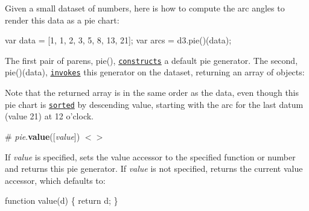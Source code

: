 Given a small dataset of numbers, here is how to compute the arc angles to render this data as a pie chart\+:


\begin{DoxyCode}
var data = [1, 1, 2, 3, 5, 8, 13, 21];
var arcs = d3.pie()(data);
\end{DoxyCode}


The first pair of parens, {\ttfamily pie()}, \href{#pie}{\tt constructs} a default pie generator. The second, {\ttfamily pie()(data)}, \href{#_pie}{\tt invokes} this generator on the dataset, returning an array of objects\+:


\begin{DoxyCode}
\end{DoxyCode}


Note that the returned array is in the same order as the data, even though this pie chart is \href{#pie_sortValues}{\tt sorted} by descending value, starting with the arc for the last datum (value 21) at 12 o’clock.

\label{_pie_value}%
\# {\itshape pie}.{\bfseries value}(\mbox{[}{\itshape value}\mbox{]}) \href{https://github.com/d3/d3-shape/blob/master/src/pie.js#L54}{\tt $<$$>$}

If {\itshape value} is specified, sets the value accessor to the specified function or number and returns this pie generator. If {\itshape value} is not specified, returns the current value accessor, which defaults to\+:


\begin{DoxyCode}
function value(d) \{
  return d;
\}
\end{DoxyCode}


